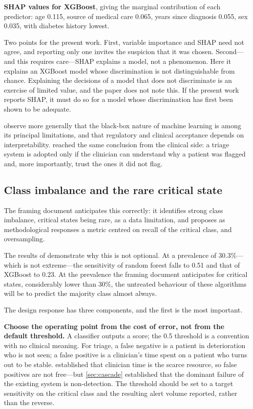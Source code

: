 \documentclass[12pt,a4paper,oneside]{report}
\begin{document}
\textbf{SHAP values for XGBoost}, giving the marginal contribution of each predictor: age 0.115, source of medical care 0.065, years since diagnosis 0.055, sex 0.035, with diabetes history lowest.

Two points for the present work. First, variable importance and SHAP need not agree, and reporting only one invites the suspicion that it was chosen. Second---and this requires care---SHAP explains a model, not a phenomenon. Here it explains an XGBoost model whose discrimination is not distinguishable from chance. Explaining the decisions of a model that does not discriminate is an exercise of limited value, and the paper does not note this. If the present work reports SHAP, it must do so for a model whose discrimination has first been shown to be adequate.

\Textcite{liu2025review} observe more generally that the black-box nature of machine learning is among its principal limitations, and that regulatory and clinical acceptance depends on interpretability.  reached the same conclusion from the clinical side: a triage system is adopted only if the clinician can understand why a patient was flagged and, more importantly, trust the ones it did not flag.

\subsection{Class imbalance and the rare critical state}\label{sec:imbalance}

The framing document anticipates this correctly: it identifies strong class imbalance, critical states being rare, as a data limitation, and proposes as methodological responses a metric centred on recall of the critical class, and oversampling.

The results of \textcite{mendoza2025} demonstrate why this is not optional. At a prevalence of 30.3\%---which is not extreme---the sensitivity of random forest falls to 0.51 and that of XGBoost to 0.23. At the prevalence the framing document anticipates for critical states, considerably lower than 30\%, the untreated behaviour of these algorithms will be to predict the majority class almost always.

The design response has three components, and the first is the most important.

\textbf{Choose the operating point from the cost of error, not from the default threshold.} A classifier outputs a score; the 0.5 threshold is a convention with no clinical meaning. For triage, a false negative is a patient in deterioration who is not seen; a false positive is a clinician's time spent on a patient who turns out to be stable.  established that clinician time is the scarce resource, so false positives are not free---but \cref{sec:cascade} established that the dominant failure of the existing system is non-detection. The threshold should be set to a target sensitivity on the critical class and the resulting alert volume reported, rather than the reverse.
\end{document}

